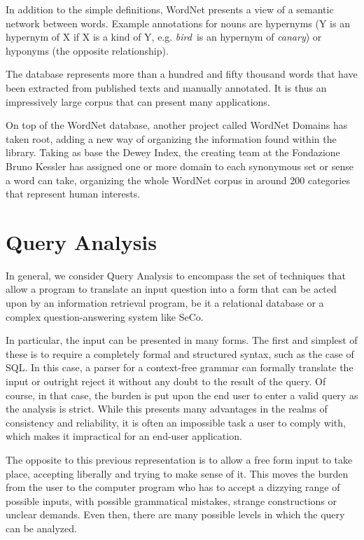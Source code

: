In addition to the simple definitions, WordNet presents a view of a semantic network between words. Example annotations for nouns are hypernyms (Y is an hypernym of X if X is a kind of Y, e.g. \emph{bird}\ is an hypernym of \emph{canary}) or hyponyms (the opposite relationship).

The database represents more than a hundred and fifty thousand words that have been extracted from published texts and manually annotated. It is thus an impressively large corpus that can present many applications.

On top of the WordNet database, another project called WordNet Domains has taken root, adding a new way of organizing the information found within the library. Taking as base the Dewey Index, the creating team at the Fondazione Bruno Kessler has assigned one or more domain to each synonymous set or sense a word can take, organizing the whole WordNet corpus in around 200 categories that represent human interests.




\section{Query Analysis} %
\label{sec:query_analysis}

In general, we consider Query Analysis to encompass the set of techniques that allow a program to translate an input question into a form that can be acted upon by an information retrieval program, be it a relational database or a complex question-answering system like SeCo.

In particular, the input can be presented in many forms. The first and simplest of these is to require a completely formal and structured syntax, such as the case of SQL. In this case, a parser for a context-free grammar can formally translate the input or outright reject it without any doubt to the result of the query. Of course, in that case, the burden is put upon the end user to enter a valid query as the analysis is strict. While this presents many advantages in the realms of consistency and reliability, it is often an impossible task a user to comply with, which makes it impractical for an end-user application.

The opposite to this previous representation is to allow a free form input to take place, accepting liberally and trying to make sense of it. This moves the burden from the user to the computer program who has to accept a dizzying range of possible inputs, with possible grammatical mistakes, strange constructions or unclear demands. Even then, there are many possible levels in which the query can be analyzed.


